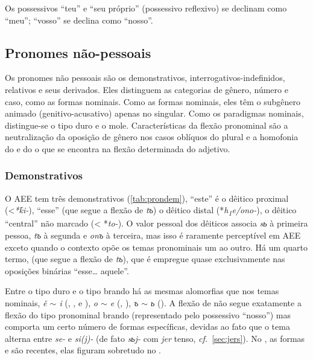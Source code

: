 \clearpage%



Os possessivos  ``teu'' e  ``seu
próprio'' (possessivo reflexivo) se declinam como 
``meu'';  ``vosso'' se declina como 
``nosso''.

\subsection{Pronomes não-pessoais}

Os pronomes não pessoais são os demonstrativos,
interrogativos-indefinidos, relativos e seus derivados. Eles distinguem
as categorias de gênero, número e caso, como as formas nominais. Como as
formas nominais, eles têm o subgênero animado (genitivo-acusativo)
apenas no singular. Como os paradigmas nominais, distingue-se o tipo
duro e o mole. Características da flexão pronominal são a neutralização
da oposição de gênero nos casos oblíquos do plural e a homofonia do
 e do  o que se encontra na flexão determinada do
adjetivo.

\clearpage%
\subsubsection{Demonstrativos}



O AEE tem três demonstrativos (\autoref{tab:prondem}),  ``este'' é o
dêitico proximal (<\emph{*k̑i-}),  ``esse'' (que
segue a flexão de \emph{tъ}) o dêitico distal
(*\emph{h\textsubscript{1}e/ono-}),  o dêitico ``central''
não marcado (< *\emph{to-}). O valor pessoal dos dêiticos associa
\emph{sь} à primeira pessoa, \emph{tъ} à segunda e \emph{onъ} à
terceira, mas isso é raramente perceptível em AEE exceto quando o
contexto opõe os temas pronominais um ao outro. Há um quarto termo,
 (que segue a flexão de \emph{tъ}), que é empregue quase
exclusivamente nas oposições binárias 
``esse\ldots{} aquele''.

Entre o tipo duro e o tipo brando há as mesmas alomorfias que nos temas
nominais, \emph{ě $\sim$ i} (, ,
 e ), \emph{o $\sim$ e}
(, ), \emph{ъ $\sim$ ь}
().
A flexão de  não segue exatamente a flexão
do tipo pronominal brando (representado pelo possessivo 
``nosso'') mas comporta um certo número de formas específicas, devidas
ao fato que o tema alterna entre \emph{se-} e \emph{si(j)-} (de fato
\emph{sьj-} com \emph{jer} tenso, \emph{cf.}~\ref{sec:jers}).
No , as formas
 e  são recentes, elas figuram sobretudo no
.

